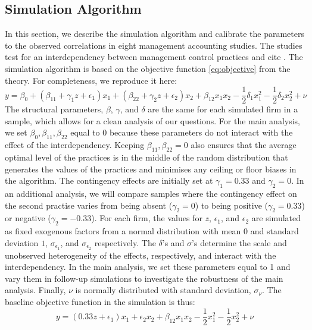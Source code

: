 \documentclass[12pt]{article}
\begin{document}
\subsection{Simulation Algorithm}

In this section, we describe the simulation algorithm and calibrate the parameters to the observed correlations in eight management accounting studies. The studies test for an interdependency between management control practices and cite \citet{grabner_management_2013}. The simulation algorithm is based on the objective function \eqref{eq:objective} from the theory. For completeness, we reproduce it here:
\begin{equation*}
y  = \beta_0 + (\beta_{11} + \gamma_1 z + \epsilon_1) x_1 
						+ (\beta_{22} + \gamma_2 z  + \epsilon_2) x_2 
                        + \beta_{12} x_1 x_2 - \frac{1}{2}\delta_1 x^2_1 - \frac{1}{2}\delta_2 x^2_2 + \nu
\end{equation*}
The structural parameters, $\beta$, $\gamma$, and $\delta$ are the same for each simulated firm in a sample, which allows for a clean analysis of our questions. For the main analysis, we set $\beta_0, \beta_{11}, \beta_{22}$ equal to $0$ because these parameters do not interact with the effect of the interdependency. Keeping $\beta_{11}, \beta_{22} = 0$ also ensures that the average optimal level of the practices is in the middle of the random distribution that generates the values of the practices and minimises any ceiling or floor biases in the algorithm. The contingency effects are initially set at $\gamma_1 = 0.33$ and $\gamma_2 = 0$. In an additional analysis, we will compare samples where the contingency effect on the second practise varies from being absent ($\gamma_2 = 0$) to being positive ($\gamma_2 = 0.33$) or negative ($\gamma_2 = -0.33$). For each firm, the values for $z$, $\epsilon_1$, and $\epsilon_2$ are simulated as fixed exogenous factors from a normal distribution with mean $0$ and standard deviation $1$,  $\sigma_{\epsilon_1}$, and $\sigma_{\epsilon_2}$ respectively. The $\delta$'s and $\sigma$'s determine the scale and unobserved heterogeneity of the effects, respectively, and interact with the interdependency. In the main analysis, we set these parameters equal to 1 and vary them in follow-up simulations to investigate the robustness of the main analysis. Finally, $\nu$ is normally distributed with standard deviation, $\sigma_{\nu}$. The baseline objective function in the simulation is thus:
\begin{equation}\label{eq:baseline}
y  = (0.33 z + \epsilon_1) x_1 
						+ \epsilon_2 x_2 
                        + \beta_{12} x_1 x_2 - \frac{1}{2}x^2_1 - \frac{1}{2}x^2_2 + \nu
\end{equation}
\end{document}
